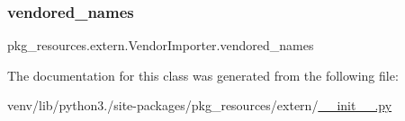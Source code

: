 \mbox{\label{classpkg__resources_1_1extern_1_1VendorImporter_abe2261f2f4d60f73258bec4857aefa27}} 
\subsubsection{\texorpdfstring{vendored\+\_\+names}{vendored\_names}}
{\footnotesize\ttfamily pkg\+\_\+resources.\+extern.\+Vendor\+Importer.\+vendored\+\_\+names}



The documentation for this class was generated from the following file\+:\begin{DoxyCompactItemize}
\item 
venv/lib/python3./site-\/packages/pkg\+\_\+resources/extern/\hyperlink{venv_2lib_2python3_89_2site-packages_2pkg__resources_2extern_2____init_____8py}{\+\_\+\+\_\+init\+\_\+\+\_\+.\+py}\end{DoxyCompactItemize}
